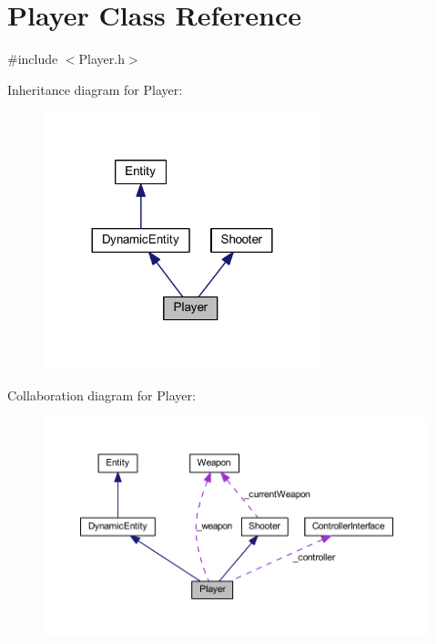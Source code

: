 \hypertarget{class_player}{
\section{Player Class Reference}
\label{d8/d53/class_player}
}


{\ttfamily \#include $<$Player.h$>$}



Inheritance diagram for Player:
\nopagebreak
\begin{figure}[H]
\begin{center}
\leavevmode
\includegraphics[width=228pt]{d9/d6c/class_player__inherit__graph}
\end{center}
\end{figure}


Collaboration diagram for Player:
\nopagebreak
\begin{figure}[H]
\begin{center}
\leavevmode
\includegraphics[width=400pt]{d6/db3/class_player__coll__graph}
\end{center}
\end{figure}

